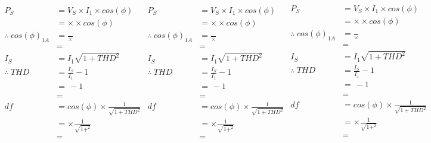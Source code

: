 	\begin{equation*}
	\begin{aligned}
	P_{S}   &= V_{S} \times I_{1} \times cos(\phi) \\
	&=  \times  \times cos(\phi) \\
	\therefore \
	cos(\phi)_{1A}  &= \frac{}{ \times } \\
	&=  \\
	I_{S}           &= I_{1} \sqrt{1+THD^{2}} \\
	\therefore \ 
	THD     &= \frac{I_{S}}{I_{1}} - 1\\    
	&= \frac{}{} - 1 \\
	&=  \\
	df      &= cos(\phi) \times \frac{1}{\sqrt{1+THD^{2}}} \\               
	&=  \times \frac{1}{\sqrt{1+^{2}}} \\
	&=      
	\end{aligned}
	\begin{aligned}
	P_{S}   &= V_{S} \times I_{1} \times cos(\phi) \\
	&=  \times  \times cos(\phi) \\
	\therefore \
	cos(\phi)_{1A}  &= \frac{}{ \times } \\
	&=  \\
	I_{S}           &= I_{1} \sqrt{1+THD^{2}} \\
	\therefore \ 
	THD     &= \frac{I_{S}}{I_{1}} - 1\\    
	&= \frac{}{} - 1 \\
	&=  \\
	df      &= cos(\phi) \times \frac{1}{\sqrt{1+THD^{2}}} \\               
	&=  \times \frac{1}{\sqrt{1+^{2}}} \\
	&=      
	\end{aligned}
	\begin{aligned}
	P_{S}   &= V_{S} \times I_{1} \times cos(\phi) \\
	&=  \times  \times cos(\phi) \\
	\therefore \
	cos(\phi)_{1A}  &= \frac{}{ \times } \\
	&=  \\
	I_{S}           &= I_{1} \sqrt{1+THD^{2}} \\
	\therefore \ 
	THD     &= \frac{I_{S}}{I_{1}} - 1\\    
	&= \frac{}{} - 1 \\
	&=  \\
	df      &= cos(\phi) \times \frac{1}{\sqrt{1+THD^{2}}} \\               
	&=  \times \frac{1}{\sqrt{1+^{2}}} \\
	&= \\
	\end{aligned}
	\end{equation*}


